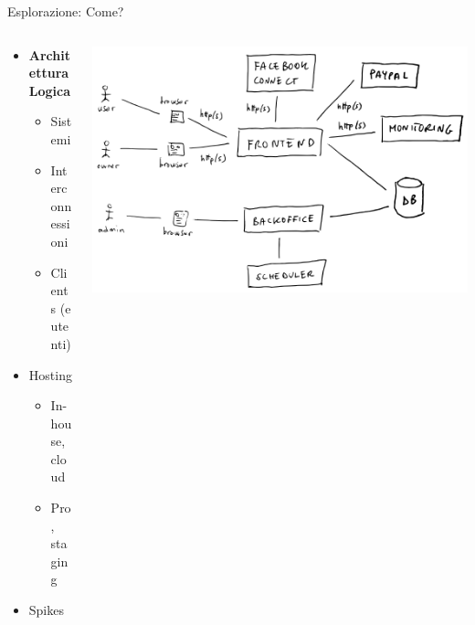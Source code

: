 \documentclass[compress, red, 14pt]{beamer}
\begin{document}
	\begin{frame}{Esplorazione: Come?}
		
		\begin{columns}[T]
		    \begin{column}{.5\textwidth}

		\begin{itemize}
			\item \textbf{Architettura Logica}
			\begin{itemize}
				\item Sistemi
				\item Interconnessioni
				\item Clients (e utenti)
			\end{itemize}
		\end{itemize}		
		
		\begin{itemize}
			\item Hosting
			\begin{itemize}
				\item In-house, cloud
				\item Pro, staging
			\end{itemize}
			\item Spikes
		\end{itemize}
		
	    \end{column}
	    \begin{column}{.5\textwidth}
			\hspace*{-0.6cm}
		    \includegraphics[scale=0.17]{images/architecture.png}
	    \end{column}
	 \end{columns}

	\end{frame}
\end{document}
